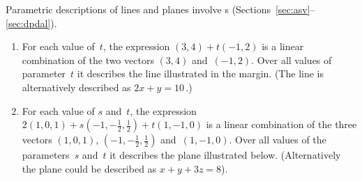 \begin{example} \label{eg:lcs}
Parametric descriptions of lines and planes  involve s (Sections~\ref{sec:asv}--\ref{sec:dpdal}).
\begin{enumerate}
\item 
For each value of~\(t\), the expression \((3,4)+t(-1,2)\) is a linear combination of the two vectors \((3,4)\) and~\((-1,2)\).  
%
Over all values of parameter~\(t\) it describes the line illustrated in the margin.
(The line is alternatively described as \(2x+y=10\)\,.)


\item For each value of \(s\) and~\(t\), the expression \(2(1,0,1)+s(-1,-\frac12,\frac12)+t(1,-1,0)\) is a linear combination of the three vectors \((1,0,1)\), \((-1,-\frac12,\frac12)\) and~\((1,-1,0)\).
Over all values of the parameters~\(s\) and~\(t\) it describes the plane illustrated below.
(Alternatively the plane could be described as \(x+y+3z=8\)).
\begin{center}
 {}
\end{center}



\end{enumerate}
\end{example}
